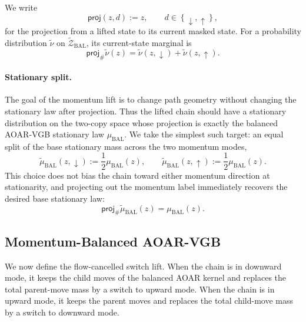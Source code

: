 \documentclass{article}
\numberwithin{theorem}{section}
\numberwithin{proposition}{section}
\numberwithin{corollary}{section}
\numberwithin{lemma}{section}
\numberwithin{conjecture}{section}
\numberwithin{remark}{section}
\numberwithin{definition}{section}
\numberwithin{assumption}{section}
\numberwithin{example}{section}
\newcommand{\calZ}{{\mathcal{Z}}}
\newcommand{\mbra}[1]{\left\{#1\right\}}
\begin{document}
We write
\begin{equation*}
    \textsf{proj}(z,d):=z,\qquad d\in\mbra{\downarrow,\uparrow},
\end{equation*}
for the projection from a lifted state to its current masked state. For a probability distribution $\widetilde\nu$ on $\widetilde{\calZ}_{\mathrm{BAL}}$, its current-state marginal is
\begin{equation*}
    \textsf{proj}_{\#}\widetilde\nu(z) = \widetilde\nu(z,\downarrow)+\widetilde\nu(z,\uparrow).
\end{equation*}

\paragraph{Stationary split.}
The goal of the momentum lift is to change path geometry without changing the stationary law after projection. Thus the lifted chain should have a stationary distribution on the two-copy space whose projection is exactly the balanced AOAR-VGB stationary law $\mu_{\mathrm{BAL}}$. We take the simplest such target: an equal split of the base stationary mass across the two momentum modes,
\begin{equation*}
    \widetilde\mu_{\mathrm{BAL}}(z,\downarrow):=\frac12\mu_{\mathrm{BAL}}(z), \qquad
    \widetilde\mu_{\mathrm{BAL}}(z,\uparrow):=\frac12\mu_{\mathrm{BAL}}(z).
\end{equation*}
This choice does not bias the chain toward either momentum direction at stationarity, and projecting out the momentum label immediately recovers the desired base stationary law:
\begin{equation*}
    \textsf{proj}_{\#}\widetilde\mu_{\mathrm{BAL}}(z)=\mu_{\mathrm{BAL}}(z).
\end{equation*}

\subsection{Momentum-Balanced AOAR-VGB}
\label{app:subsec:momentum_balanced_aoar_vgb}

We now define the flow-cancelled switch lift. When the chain is in downward mode, it keeps the child moves of the balanced AOAR kernel and replaces the total parent-move mass by a switch to upward mode. When the chain is in upward mode, it keeps the parent moves and replaces the total child-move mass by a switch to downward mode.
\end{document}
